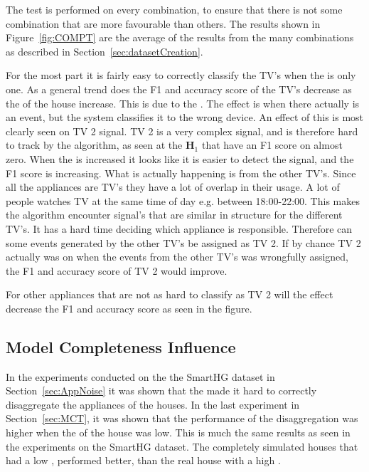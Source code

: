 The test is performed on every combination, to ensure that there is not some combination that are more favourable than others. The results shown in Figure~\ref{fig:COMPT} are the average of the results from the many combinations as described in Section~\ref{sec:datasetCreation}. 

For the most part it is fairly easy to correctly classify the TV's when the  is only one. As a general trend does the F1 and accuracy score of the TV's decrease as the  of the house increase. This is due to the . The  effect is when there actually is an event, but the system classifies it to the wrong device.  An effect of this is most clearly seen on TV 2 signal. TV 2 is a very complex signal, and is therefore hard to track by the algorithm, as seen at the $\textbf{H}_1$  that have an F1 score on almost zero. When the  is increased it looks like it is easier to detect the signal, and the F1 score is increasing. What is actually happening is  from the other TV's. Since all the appliances are TV's they have a lot of overlap in their usage. A lot of people watches TV at the same time of day e.g. between 18:00-22:00. This makes the algorithm encounter signal's that are similar in structure for the different TV's. It has a hard time deciding which appliance is responsible. Therefore can some events generated by the other TV's be assigned as TV 2. If by chance TV 2 actually was on when the events from the other TV's was wrongfully assigned, the F1 and accuracy score of TV 2 would improve. 

For other appliances that are not as hard to classify as TV 2 will the  effect decrease the F1 and accuracy score as seen in the figure. 

\subsection{Model Completeness Influence}
In the experiments conducted on the the SmartHG dataset in Section~\ref{sec:AppNoise} it was shown that the  made it hard to correctly disaggregate the appliances of the houses. In the last experiment in Section~\ref{sec:MCT}, it was shown that the performance of the disaggregation was higher when the  of the house was low. This is much the same results as seen in the experiments on the SmartHG dataset. The completely simulated houses that had a low , performed better, than the real house with a high . 

